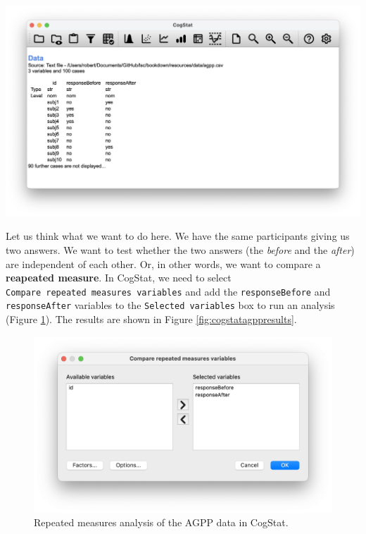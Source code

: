 \documentclass[
  11pt,
  a4paper,
  twoside,symmetric,openright]{book}
\theoremstyle{break}
\theoremstyle{break}
\begin{document}
\begin{center}\includegraphics[width=0.6\linewidth]{resources/image/cogstatloadagpp} \end{center}

Let us think what we want to do here. We have the same participants giving us two answers. We want to test whether the two answers (the \emph{before} and the \emph{after}) are independent of each other. Or, in other words, we want to compare a \textbf{reapeated measure}. In CogStat, we need to select \texttt{Compare\ repeated\ measures\ variables} and add the \texttt{responseBefore} and \texttt{responseAfter} variables to the \texttt{Selected\ variables} box to run an analysis (Figure \ref{fig:cogstatrepeatagpp}). The results are shown in Figure \ref{fig:cogstatagppresults}.

\begin{figure}

{\centering \includegraphics[width=0.6\linewidth]{resources/image/cogstatrepeatagpp} 

}

\caption{Repeated measures analysis of the AGPP data in CogStat.}\label{fig:cogstatrepeatagpp}
\end{figure}
\end{document}
